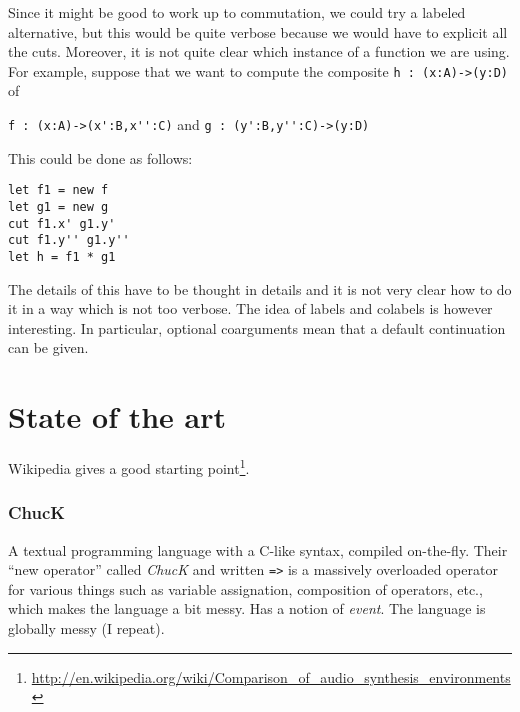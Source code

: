 \documentclass[a4paper,titlepage]{article}
\begin{document}
Since it might be good to work up to commutation, we could try a labeled
alternative, but this would be quite verbose because we would have to explicit
all the cuts. Moreover, it is not quite clear which instance of a function we
are using. For example, suppose that we want to compute the composite
\verb|h : (x:A)->(y:D)| of
\begin{center}
  \verb|f : (x:A)->(x':B,x'':C)|
  \qquad and\qquad
  \verb|g : (y':B,y'':C)->(y:D)|
\end{center}
This could be done as follows:
\begin{verbatim}
let f1 = new f
let g1 = new g
cut f1.x' g1.y'
cut f1.y'' g1.y''
let h = f1 * g1
\end{verbatim}
The details of this have to be thought in details and it is not very clear how
to do it in a way which is not too verbose. The idea of labels and colabels is
however interesting. In particular, optional coarguments mean that a default
continuation can be given.

\section{State of the art}
Wikipedia gives a good starting
point\footnote{\url{http://en.wikipedia.org/wiki/Comparison_of_audio_synthesis_environments}}.


\subsubsection{ChucK}
A textual programming language with a C-like syntax, compiled
on-the-fly\cite{chuck}. Their ``new operator'' called \emph{ChucK} and written
\texttt{=>} is a massively overloaded operator for various things such as
variable assignation, composition of operators, etc., which makes the language a
bit messy. Has a notion of \emph{event}. The language is globally messy (I
repeat).
\end{document}
